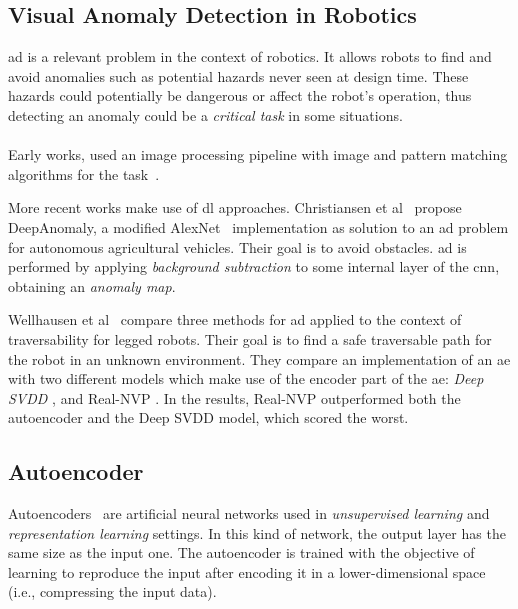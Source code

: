 \subsection{Visual Anomaly Detection in Robotics}

    \acrshort{ad} is a relevant problem in the context of robotics. It allows robots to find and avoid anomalies such as potential hazards never seen at design time. These hazards could potentially be dangerous or affect the robot's operation, thus detecting an anomaly could be a \emph{critical task} in some situations.
    \\
    \\
    Early works, used an image processing pipeline with image and pattern matching algorithms for the task~\cite{chakravarty2007anomaly}.
    
    More recent works make use of \acrfull{dl} approaches. Christiansen et al~\cite{christiansen2016deepanomaly} propose DeepAnomaly, a modified AlexNet~\cite{alexnet} implementation as solution to an \acrshort{ad} problem for autonomous agricultural vehicles. Their goal is to avoid obstacles. \acrshort{ad} is performed by applying \emph{background subtraction} to some internal layer of the \acrshort{cnn}, obtaining an \emph{anomaly map}.
    
    Wellhausen et al~\cite{wellhausen2020safe} compare three methods for \acrshort{ad} applied to the context of traversability for legged robots. Their goal is to find a safe traversable path for the robot in an unknown environment. They compare an implementation of an \acrshort{ae} with two different models which make use of the encoder part of the \acrshort{ae}: \emph{Deep SVDD} \cite{scime2018multi}, and Real-NVP \cite{ruff2018deep}. In the results, Real-NVP outperformed both the autoencoder and the Deep SVDD model, which scored the worst.

\subsection{Autoencoder}

Autoencoders~\cite{kramer1991nonlinear} are artificial neural networks used in \emph{unsupervised learning} and \emph{representation learning} settings. In this kind of network, the output layer has the same size as the input one. The autoencoder is trained with the objective of learning to reproduce the input after encoding it in a lower-dimensional space (i.e., compressing the input data).

